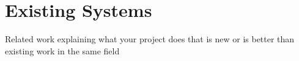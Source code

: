 \section{Existing Systems}

{\color{red} Related work explaining what your project does that is new or is better than existing work in the same field}